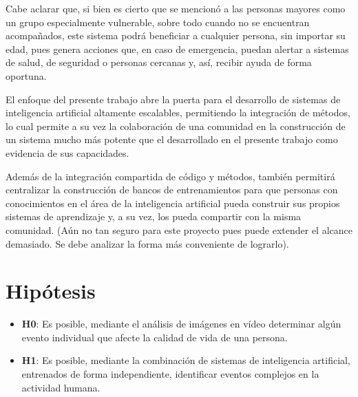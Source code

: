     Cabe aclarar que, si bien es cierto que se mencionó a las personas mayores como un grupo especialmente vulnerable, sobre todo cuando no se encuentran acompañados, este sistema podrá beneficiar a cualquier persona, sin importar su edad, pues genera acciones que, en caso de emergencia, puedan alertar a sistemas de salud, de seguridad o personas cercanas y, así, recibir ayuda de forma oportuna.
    
    El enfoque del presente trabajo abre la puerta para el desarrollo de sistemas de inteligencia artificial altamente escalables, permitiendo la integración de métodos, lo cual permite a su vez la colaboración de una comunidad en la construcción de un sistema mucho más potente que el desarrollado en el presente trabajo como evidencia de sus capacidades.
    
    Además de la integración compartida de código y métodos, también permitirá centralizar la construcción de bancos de entrenamientos para que personas con conocimientos en el área de la inteligencia artificial pueda construir sus propios sistemas de aprendizaje y, a su vez, los pueda compartir con la misma comunidad.  (Aún no tan seguro para este proyecto pues puede extender el alcance demasiado. Se debe analizar la forma más conveniente de lograrlo).
    
\newpage
\section{Hipótesis}
\label{Hypothesis}

    \vspace{1cm}
    \begin{itemize}
        \item \textbf{H0}: Es posible, mediante el análisis de imágenes en vídeo determinar algún evento individual que afecte la calidad de vida de una persona.
        \vspace{1cm}
        \item \textbf{H1}: Es posible, mediante la combinación de sistemas de inteligencia artificial, entrenados de forma independiente, identificar eventos complejos en la actividad humana.
    \end{itemize}
\newpage
